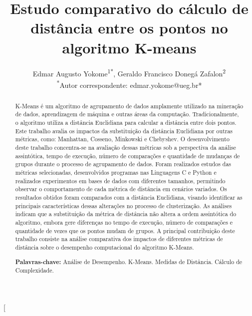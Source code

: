 \documentclass[10pt,a4paper,twocolumn]{article}
\title{Estudo comparativo do cálculo de distância entre os pontos no algoritmo K-means}
\author{
Edmar Augusto Yokome\textsuperscript{1*}, Geraldo Francisco Donegá Zafalon\textsuperscript{2}
\\
\normalsize \textsuperscript{*}Autor correspondente: edmar.yokome@ueg.br*\\
}
\date{}
\begin{document}
\twocolumn[
\maketitle

\begin{@twocolumnfalse}
\begin{abstract}
\noindent 
K-Means é um algoritmo de agrupamento de dados amplamente utilizado na mineração de dados, aprendizagem de máquina e outras áreas da computação. Tradicionalmente, o algoritmo utiliza a distância Euclidiana para calcular a distância entre dois pontos. Este trabalho avalia os impactos da substituição da distância Euclidiana por outras métricas, como: Manhattan, Cosseno, Minkowski e Chebyshev. O desenvolvimento deste trabalho concentra-se na avaliação dessas métricas sob a perspectiva da análise assintótica, tempo de execução, número de comparações e quantidade de mudanças de grupos durante o processo de agrupamento de dados. Foram realizados estudos das métricas selecionadas, desenvolvidos programas nas Linguagens C e Python e realizados experimentos em bases de dados com diferentes tamanhos, permitindo observar o comportamento de cada métrica de distância em cenários variados. Os resultados obtidos foram comparados com a distância Euclidiana, visando identificar as principais características dessas alterações no processo de clusterização. As análises indicam que a substituição da métrica de distância não altera a ordem assintótica do algoritmo, embora gere diferenças no tempo de execução, número de comparações e quantidade de vezes que os pontos mudam de grupos. A principal contribuição deste trabalho consiste na análise comparativa dos impactos de diferentes métricas de distância sobre o desempenho computacional do algoritmo K-Means. 


\vspace{0.3em}
\noindent \textbf{Palavras-chave:} Análise de Desempenho. K-Means. Medidas de Distância. Cálculo de Complexidade.
\end{abstract}

\begin{abstract}


\end{abstract}
\end{@twocolumnfalse}
\end{document}
